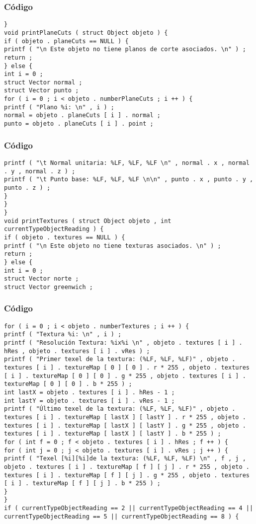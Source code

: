 \documentclass{beamer}
\begin{document}
\begin{frame}[fragile]
\frametitle{C\'odigo}
\begin{verbatim}
} 
void printPlaneCuts ( struct Object objeto ) { 
if ( objeto . planeCuts == NULL ) { 
printf ( "\n Este objeto no tiene planos de corte asociados. \n" ) ; 
return ; 
} else { 
int i = 0 ; 
struct Vector normal ; 
struct Vector punto ; 
for ( i = 0 ; i < objeto . numberPlaneCuts ; i ++ ) { 
printf ( "Plano %i: \n" , i ) ; 
normal = objeto . planeCuts [ i ] . normal ; 
punto = objeto . planeCuts [ i ] . point ; 
\end{verbatim}
\end{frame}
\begin{frame}[fragile]
\frametitle{C\'odigo}
\begin{verbatim}
printf ( "\t Normal unitaria: %LF, %LF, %LF \n" , normal . x , normal . y , normal . z ) ; 
printf ( "\t Punto base: %LF, %LF, %LF \n\n" , punto . x , punto . y , punto . z ) ; 
} 
} 
} 
void printTextures ( struct Object objeto , int currentTypeObjectReading ) { 
if ( objeto . textures == NULL ) { 
printf ( "\n Este objeto no tiene texturas asociados. \n" ) ; 
return ; 
} else { 
int i = 0 ; 
struct Vector norte ; 
struct Vector greenwich ; 
\end{verbatim}
\end{frame}
\begin{frame}[fragile]
\frametitle{C\'odigo}
\begin{verbatim}
for ( i = 0 ; i < objeto . numberTextures ; i ++ ) { 
printf ( "Textura %i: \n" , i ) ; 
printf ( "Resolución Textura: %ix%i \n" , objeto . textures [ i ] . hRes , objeto . textures [ i ] . vRes ) ; 
printf ( "Primer texel de la textura: (%LF, %LF, %LF)" , objeto . textures [ i ] . textureMap [ 0 ] [ 0 ] . r * 255 , objeto . textures [ i ] . textureMap [ 0 ] [ 0 ] . g * 255 , objeto . textures [ i ] . textureMap [ 0 ] [ 0 ] . b * 255 ) ; 
int lastX = objeto . textures [ i ] . hRes - 1 ; 
int lastY = objeto . textures [ i ] . vRes - 1 ; 
printf ( "Último texel de la textura: (%LF, %LF, %LF)" , objeto . textures [ i ] . textureMap [ lastX ] [ lastY ] . r * 255 , objeto . textures [ i ] . textureMap [ lastX ] [ lastY ] . g * 255 , objeto . textures [ i ] . textureMap [ lastX ] [ lastY ] . b * 255 ) ; 
for ( int f = 0 ; f < objeto . textures [ i ] . hRes ; f ++ ) { 
for ( int j = 0 ; j < objeto . textures [ i ] . vRes ; j ++ ) { 
printf ( "Texel [%i][%i]de la textura: (%LF, %LF, %LF) \n" , f , j , objeto . textures [ i ] . textureMap [ f ] [ j ] . r * 255 , objeto . textures [ i ] . textureMap [ f ] [ j ] . g * 255 , objeto . textures [ i ] . textureMap [ f ] [ j ] . b * 255 ) ; 
} 
} 
if ( currentTypeObjectReading == 2 || currentTypeObjectReading == 4 || currentTypeObjectReading == 5 || currentTypeObjectReading == 8 ) { 
\end{verbatim}
\end{frame}
\end{document}
